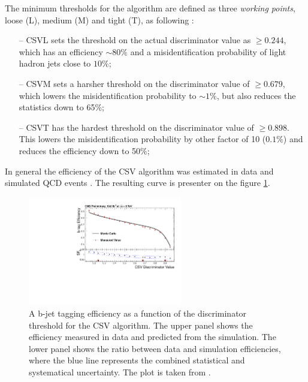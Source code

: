 The minimum thresholds for the algorithm are defined as three \textit{working points}, loose (L), medium (M) and tight (T), as following \cite{CMS-PAS-BTV-13-001}:

\begin{itemize}
 \item [--] CSVL sets the threshold on the actual discriminator value as $\geq 0.244$, which has an efficiency $\sim 80\%$ and a misidentification probability of
 light hadron jets close to $10\%$;
 \item [--] CSVM sets a harsher threshold on the discriminator value of $\geq 0.679$, which lowers the misidentification probability to $\sim 1\%$, but also
 reduces the statistics down to 65$\%$;
 \item [--] CSVT has the hardest threshold on the discriminator value of $\geq 0.898$. This lowers the misidentification probability by other factor of 10 ($0.1\%$)
 and reduces the efficiency down to 50$\%$;
\end{itemize}

In general the efficiency of the CSV algorithm was estimated in data and simulated QCD events \cite{CMS-PAS-BTV-13-001}. The resulting curve is presenter on the figure \ref{fig:CSVeff}.

\begin{figure}[t]
  \centering
  \includegraphics[width=0.6\textwidth]{04_event_reconstruction/plots/Figure_012-b.pdf}
  \caption{A b-jet tagging efficiency as a function of the discriminator threshold for the CSV algorithm. The upper panel shows the efficiency measured in data and predicted from the simulation.
  The lower panel shows the ratio between data and simulation efficiencies, where the blue line represents the combined statistical and systematical uncertainty. The plot is taken from \cite{CMS-PAS-BTV-13-001}.}
  \label{fig:CSVeff}
\end{figure}

